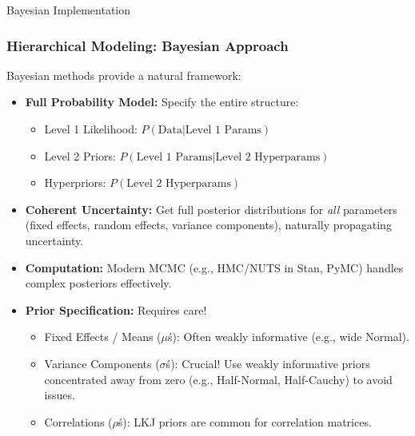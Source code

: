 \documentclass[aspectratio=169]{beamer}
\begin{document}
\begin{frame}[fragile]{Bayesian Implementation}
    \frametitle{Hierarchical Modeling: Bayesian Approach}
    Bayesian methods provide a natural framework:
    \pause
    \begin{itemize}
        \item \textbf{Full Probability Model:} Specify the entire structure:
        \begin{itemize}
            \item Level 1 Likelihood: $P(\text{Data} | \text{Level 1 Params})$
            \item Level 2 Priors: $P(\text{Level 1 Params} | \text{Level 2 Hyperparams})$
            \item Hyperpriors: $P(\text{Level 2 Hyperparams})$
        \end{itemize}
        \pause
        \item \textbf{Coherent Uncertainty:} Get full posterior distributions for \emph{all} parameters (fixed effects, random effects, variance components), naturally propagating uncertainty.
        \pause
        \item \textbf{Computation:} Modern MCMC (e.g., HMC/NUTS in Stan, PyMC) handles complex posteriors effectively.
        \pause
        \item \textbf{Prior Specification:} Requires care!
        \begin{itemize}
            \item Fixed Effects / Means ($\mu$\'s): Often weakly informative (e.g., wide Normal).
            \item Variance Components ($\sigma$\'s): Crucial! Use weakly informative priors concentrated away from zero (e.g., Half-Normal, Half-Cauchy) to avoid issues.
            \item Correlations ($\rho$\'s): LKJ priors are common for correlation matrices.
        \end{itemize}
    \end{itemize}
\end{frame}
\end{document}
